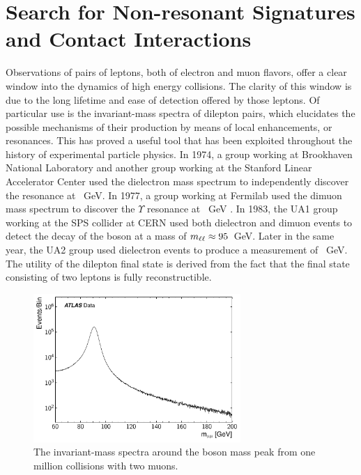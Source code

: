 \chapter{Search for Non-resonant Signatures and Contact Interactions}\label{sec:ci}

Observations of pairs of leptons, both of electron and muon flavors, offer a clear window into the dynamics of high energy collisions.
The clarity of this window is due to the long lifetime and ease of detection offered by those leptons.
Of particular use is the invariant-mass spectra of dilepton pairs, which elucidates the possible mechanisms of their production by means of local enhancements, or resonances. 
This has proved a useful tool that has been exploited throughout the history of experimental particle physics.
In 1974, a group working at Brookhaven National Laboratory\cite{jpsiBnl} and another group working at the Stanford Linear Accelerator Center\cite{jpsiSlac} used the dielectron mass spectrum to independently discover the \jpsi resonance at ~GeV.
In 1977, a group working at Fermilab used the dimuon mass spectrum to discover the $\Upsilon$ resonance at ~GeV \cite{upsilon}.
In 1983, the UA1 group working at the SPS collider at CERN used both dielectron and dimuon events to detect the decay of the \Z boson at a mass of $m_{\ell\ell}\approx95$~GeV\cite{z0ua1}.
Later in the same year, the UA2 group used dielectron events to produce a measurement of ~GeV.
The utility of the dilepton final state is derived from the fact that the final state consisting of two leptons is fully reconstructible.

\begin{figure}[htp]
\captionsetup[subfigure]{position=b}
\centering
\includegraphics[width=0.7\textwidth]{figures/ci/lowmass/lowmass-lower.pdf}
\caption{The invariant-mass spectra around the \Z boson mass peak from one million collisions with two muons.}
\label{fig:ciLowMass}
\end{figure}

